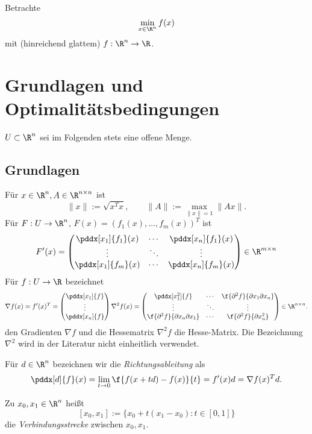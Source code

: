 \documentclass{mycourse}
\begin{document}
Betrachte
\[
	\min_{x\in \R^n} f(x)
\]
mit (hinreichend glattem) $f : \R^n \to \R$.


\section{Grundlagen und Optimalitätsbedingungen}


$U \subset \R^n$ sei im Folgenden stets eine offene Menge.


\subsection{Grundlagen}

Für $x \in \R^n, A \in \R^{n\times n}$ ist
\[
	\|x\| := \sqrt{x^T x}, \qquad
	\|A\| := \max_{\|x\|=1} \|Ax\|.
\]
Für $F: U \to \R^n$, $F(x) = (f_1(x), \dotsc, f_m(x))^T$ ist
\[
	F'(x) = \begin{pmatrix}
		\pddx[x_1]{f_1}(x) & \cdots & \pddx[x_n]{f_1}(x) \\
		\vdots & \ddots & \vdots \\
		\pddx[x_1]{f_m}(x) & \cdots & \pddx[x_n]{f_m}(x) \\
	\end{pmatrix} \in \R^{m\times n}
\]
Für $f: U \to \R$ bezeichnet
\[
	\nabla f(x)
	= f'(x)^T
	= \begin{pmatrix}
		\pddx[x_1]{f} \\
		\vdots \\
		\pddx[x_n]{f} \\
	\end{pmatrix} \\
	\nabla^2 f(x)
	= \begin{pmatrix}
		\pddx[x_1^2]{f} & \cdots & \f{\partial^2 f}{\partial x_1 \partial x_n} \\
		\vdots & \ddots & \vdots \\
		\f{\partial^2 f}{\partial x_n \partial x_1} & \cdots & \f{\partial^2 f}{\partial x_n^2} \\
	\end{pmatrix} \in \R^{n\times n}.
\]
den Gradienten $\nabla f$ und die Hessematrix $\nabla^2 f$ die Hesse-Matrix.
Die Bezeichnung $\nabla^2$ wird in der Literatur nicht einheitlich verwendet.

Für $d \in \R^n$ bezeichnen wir die \emph{Richtungsableitung} als
\[
	\pddx[d]{f}(x)
	= \lim_{t\to 0} \f {f(x+td) - f(x)}{t}
	= f'(x) d = \nabla f(x)^T d.
\]

\begin{df} \label{2.1}
	Zu $x_0,x_1 \in \R^n$ heißt
	\[
		[x_0, x_1] := \{ x_0 + t(x_1-x_0) : t \in [0,1] \}
	\]
	die \emph{Verbindungsstrecke} zwischen $x_0, x_1$.
\end{df}
\end{document}
